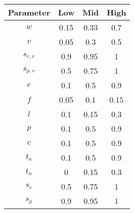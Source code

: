 \begin{tabular}[t]{>{\ttfamily}c<{\normalfont}ccc}
\toprule
\textnormal{Parameter} & Low   & Mid   & High \\
\midrule
$w$  & 0.15  & 0.33  & 0.7 \\
$v$ & 0.05  & 0.3   & 0.5 \\
$s_{e,v}$ & 0.9   & 0.95  & 1 \\
$s_{p,v}$ & 0.5   & 0.75  & 1 \\
$e$    & 0.1   & 0.5   & 0.9 \\
$f$ & 0.05  & 0.1   & 0.15 \\
$l$ & 0.1   & 0.15  & 0.3 \\
$p$ & 0.1   & 0.5   & 0.9 \\
$c$ & 0.1   & 0.5   & 0.9 \\
$t_a$ & 0.1   & 0.5   & 0.9 \\
$t_n$ & 0     & 0.15  & 0.3 \\
$s_e$ & 0.5   & 0.75  & 1 \\
$s_p$ & 0.9   & 0.95  & 1 \\
\bottomrule
\end{tabular}%
